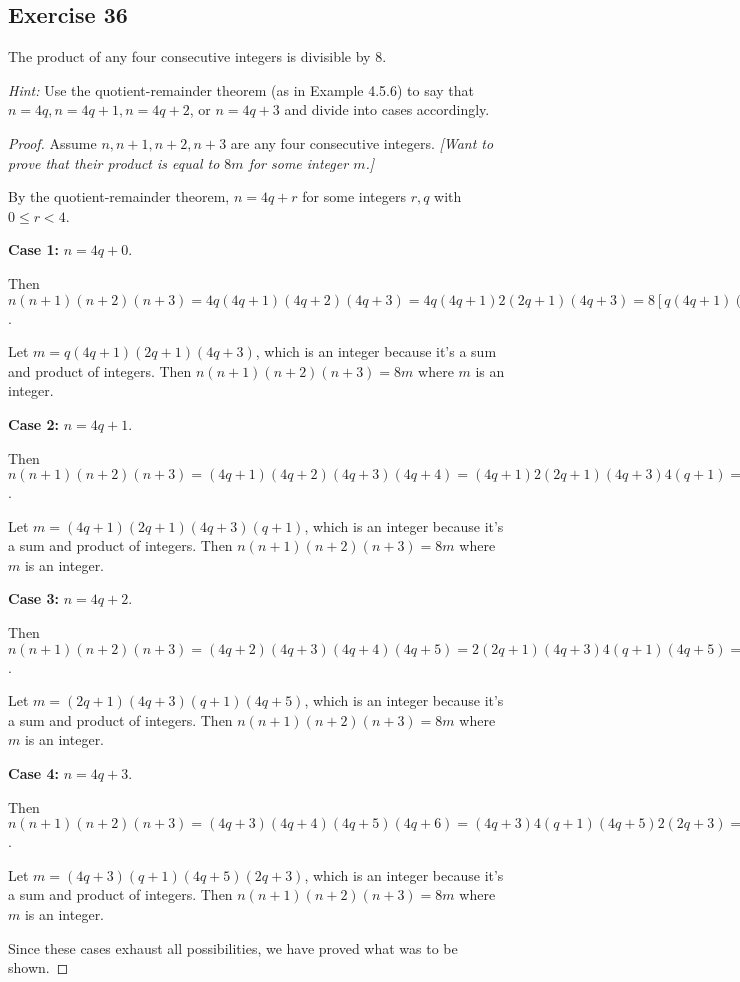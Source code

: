 \documentclass[14pt]{extarticle}
\begin{document}
\subsection{Exercise 36}
The product of any four consecutive integers is divisible by 8.

    {\it Hint:} Use the quotient-remainder theorem (as in Example 4.5.6) to say that $n = 4q, n = 4q + 1, n = 4q + 2$, or $n = 4q + 3$ and divide into cases accordingly.

\begin{proof}
    Assume $n, n+1, n+2, n+3$ are any four consecutive integers. {\it [Want to prove that their product is equal to $8m$ for some integer $m$.]}

    By the quotient-remainder theorem, $n = 4q+r$ for some integers $r,q$ with $0 \leq r < 4$.

        {\bf Case 1:} $n = 4q + 0$.

    Then $n(n+1)(n+2)(n+3) = 4q(4q+1)(4q+2)(4q+3) = 4q(4q+1)2(2q+1)(4q+3) = 8[q(4q+1)(2q+1)(4q+3)]$.

    Let $m = q(4q+1)(2q+1)(4q+3)$, which is an integer because it's a sum and product of integers. Then $n(n+1)(n+2)(n+3) = 8m$ where $m$ is an integer.

        {\bf Case 2:} $n = 4q + 1$.

    Then $n(n+1)(n+2)(n+3) = (4q+1)(4q+2)(4q+3)(4q+4) = (4q+1)2(2q+1)(4q+3)4(q+1) = 8[(4q+1)(2q+1)(4q+3)(q+1)]$.

    Let $m = (4q+1)(2q+1)(4q+3)(q+1)$, which is an integer because it's a sum and product of integers. Then $n(n+1)(n+2)(n+3) = 8m$ where $m$ is an integer.

        {\bf Case 3:} $n = 4q + 2$.

    Then $n(n+1)(n+2)(n+3) = (4q+2)(4q+3)(4q+4)(4q+5) = 2(2q+1)(4q+3)4(q+1)(4q+5) = 8[(2q+1)(4q+3)(q+1)(4q+5)]$.

    Let $m = (2q+1)(4q+3)(q+1)(4q+5)$, which is an integer because it's a sum and product of integers. Then $n(n+1)(n+2)(n+3) = 8m$ where $m$ is an integer.

        {\bf Case 4:} $n = 4q + 3$.

    Then $n(n+1)(n+2)(n+3) = (4q+3)(4q+4)(4q+5)(4q+6) = (4q+3)4(q+1)(4q+5)2(2q+3) = 8[(4q+3)(q+1)(4q+5)(2q+3)]$.

    Let $m = (4q+3)(q+1)(4q+5)(2q+3)$, which is an integer because it's a sum and product of integers. Then $n(n+1)(n+2)(n+3) = 8m$ where $m$ is an integer.

    Since these cases exhaust all possibilities, we have proved what was to be shown.
\end{proof}
\end{document}
